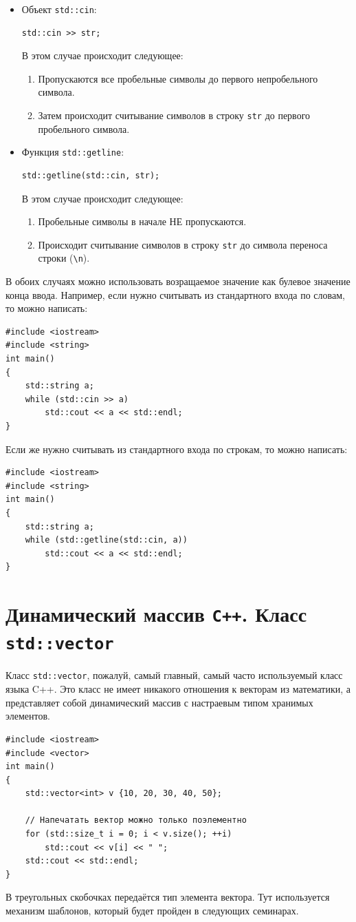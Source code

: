\documentclass{article}
\begin{document}
\begin{itemize}
\item Объект \texttt{std::cin}:
\begin{lstlisting}
std::cin >> str;
\end{lstlisting}
В этом случае происходит следующее:
\begin{enumerate}
\item Пропускаются все пробельные символы до первого непробельного символа.
\item Затем происходит считывание символов в строку \texttt{str} до первого пробельного символа.
\end{enumerate}

\item Функция \texttt{std::getline}:
\begin{lstlisting}
std::getline(std::cin, str);
\end{lstlisting}
В этом случае происходит следующее:
\begin{enumerate}
\item Пробельные символы в начале НЕ пропускаются.
\item Происходит считывание символов в строку \texttt{str} до символа переноса строки (\texttt{\textbackslash n}).
\end{enumerate}
\end{itemize}
В обоих случаях можно использовать возращаемое значение как булевое значение конца ввода.
Например, если нужно считывать из стандартного входа по словам, то можно написать:
\begin{lstlisting}
#include <iostream>
#include <string>
int main()
{
    std::string a;
    while (std::cin >> a)
        std::cout << a << std::endl;
}
\end{lstlisting}
Если же нужно считывать из стандартного входа по строкам, то можно написать:
\begin{lstlisting}
#include <iostream>
#include <string>
int main()
{
    std::string a;
    while (std::getline(std::cin, a))
        std::cout << a << std::endl;
}
\end{lstlisting}


\newpage
\section*{Динамический массив \texttt{C++}. Класс \texttt{std::vector}}
Класс \texttt{std::vector}, пожалуй, самый главный, самый часто используемый класс языка C++. Это класс не имеет никакого отношения к векторам из математики, а представляет собой динамический массив с настраевым типом хранимых элементов. 
\begin{lstlisting}
#include <iostream>
#include <vector>
int main()
{
    std::vector<int> v {10, 20, 30, 40, 50};

    // Напечатать вектор можно только поэлементно
    for (std::size_t i = 0; i < v.size(); ++i)
        std::cout << v[i] << " ";
    std::cout << std::endl;
}
\end{lstlisting}
В треугольных скобочках передаётся тип элемента вектора. Тут используется механизм шаблонов, который будет пройден в следующих семинарах.
\end{document}
